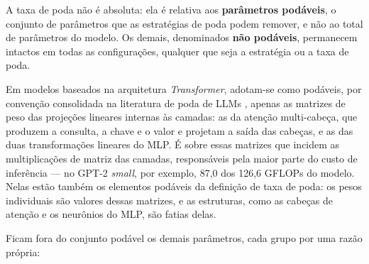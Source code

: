 A taxa de poda não é absoluta: ela é relativa aos \textbf{parâmetros podáveis}, o conjunto
de parâmetros que as estratégias de poda podem remover, e não ao total de parâmetros do
modelo. Os demais, denominados \textbf{não podáveis}, permanecem intactos em todas as
configurações, qualquer que seja a estratégia ou a taxa de poda.

Em modelos baseados na arquitetura \textit{Transformer}, adotam-se como podáveis, por
convenção consolidada na literatura de poda de LLMs \cite{Frantar2023,Sun2024}, apenas as
matrizes de peso das projeções lineares internas às camadas: as da atenção multi-cabeça,
que produzem a consulta, a chave e o valor e projetam a saída das cabeças,
e as das duas transformações lineares do MLP. É sobre essas matrizes que incidem as
multiplicações de matriz das camadas, responsáveis pela maior parte do custo de inferência
--- no GPT-2 \textit{small}, por exemplo, 87,0 dos 126,6 GFLOPs do modelo.
Nelas estão também os elementos podáveis da definição
de taxa de poda: os pesos individuais são valores dessas matrizes, e as estruturas, como as
cabeças de atenção e os neurônios do MLP, são fatias delas.

Ficam fora do conjunto podável os demais parâmetros, cada grupo por uma razão própria:

